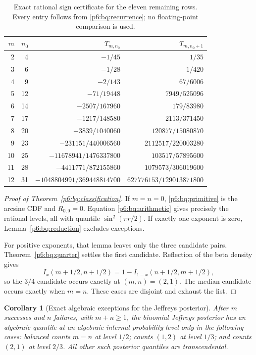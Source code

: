 \documentclass[11pt,a4paper]{article}
\newtheorem{corollary}[theorem]{Corollary}
\theoremstyle{definition}
\theoremstyle{remark}
\numberwithin{equation}{section}
\begin{document}
\begin{table}[htbp]
\centering
\small
\renewcommand{\arraystretch}{1.35}
\begin{tabular}{r r r r}
\hline
$m$&$n_0$&$T_{m,n_0}$&$T_{m,n_0+1}$\\
\hline
2&4&$-1/45$&$1/35$\\
3&6&$-1/28$&$1/420$\\
4&9&$-2/143$&$67/6006$\\
5&12&$-71/19448$&$7949/525096$\\
6&14&$-2507/167960$&$179/83980$\\
7&17&$-1217/148580$&$2113/371450$\\
8&20&$-3839/1040060$&$120877/15080870$\\
9&23&$-231151/440006560$&$2112517/220003280$\\
10&25&$-11678941/1476337800$&$103517/57895600$\\
11&28&$-4411771/872155860$&$1079573/306019600$\\
12&31&$-1048804991/369448814700$&$627776153/129013871800$\\
\hline
\end{tabular}
\caption{Exact rational sign certificate for the eleven remaining rows.
Every entry follows from \eqref{p6:bq:recurrence}; no floating-point
comparison is used.}\label{p6:bq:table}
\end{table}

\begin{proof}[Proof of Theorem~\ref{p6:bq:classification}]
If $m=n=0$, \eqref{p6:bq:primitive} is the arcsine CDF and
$R_{0,0}=0$. Equation \eqref{p6:bq:arithmetic} gives precisely
the rational levels, all with quantile $\sin^2(\pi r/2)$.
If exactly one exponent is zero, Lemma~\ref{p6:bq:reduction}
excludes exceptions.

For positive exponents, that lemma leaves only the three
candidate pairs. Theorem~\ref{p6:bq:quarter} settles the first
candidate. Reflection of the beta density gives
\[
 I_x(m+1/2,n+1/2)=1-I_{1-x}(n+1/2,m+1/2),
\]
so the $3/4$ candidate occurs exactly at $(m,n)=(2,1)$.
The median candidate occurs exactly when $m=n$.
These cases are disjoint and exhaust the list.
\end{proof}

\begin{corollary}[Exact algebraic exceptions for the Jeffreys posterior]
\label{p6:bq:posterior}
After $m$ successes and $n$ failures, with $m+n\ge1$, the
binomial Jeffreys posterior has an algebraic quantile at an
algebraic internal probability level only in the following cases:
balanced counts $m=n$ at level $1/2$; counts $(1,2)$ at level
$1/3$; and counts $(2,1)$ at level $2/3$. All other such
posterior quantiles are transcendental.
\end{corollary}
\end{document}
